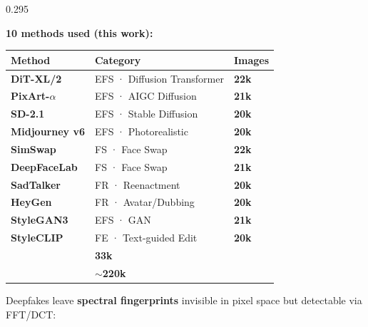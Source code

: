 \documentclass[final]{beamer}
\begin{document}
\begin{frame}[t]{}
\begin{columns}[T]
\begin{column}{0.295\linewidth}
\begin{tcolorbox}[card, title={\faDatabase\ \ DF40 Dataset — NeurIPS 2024},
  colbacktitle=Navy, coltitle=White]
\vspace{6pt}
\textbf{10 methods used (this work):}

\vspace{3pt}
\renewcommand{\arraystretch}{1.15}
{\footnotesize
\begin{tabularx}{\linewidth}{@{}>{\bfseries}l X >{\color{Teal}\bfseries\raggedleft\arraybackslash}p{1.2cm}@{}}
\toprule
\rowcolor{Navy!8} Method & Category & Images \\
\midrule
\rowcolor{RowA} DiT-XL/2       & EFS · Diffusion Transformer & 22k \\
                PixArt-$\alpha$ & EFS · AIGC Diffusion        & 21k \\
\rowcolor{RowA} SD-2.1          & EFS · Stable Diffusion      & 20k \\
                Midjourney v6   & EFS · Photorealistic        & 20k \\
\rowcolor{RowA} SimSwap         & FS  · Face Swap             & 22k \\
                DeepFaceLab     & FS  · Face Swap             & 21k \\
\rowcolor{RowA} SadTalker       & FR  · Reenactment           & 20k \\
                HeyGen          & FR  · Avatar/Dubbing        & 20k \\
\rowcolor{RowA} StyleGAN3       & EFS · GAN                   & 21k \\
                StyleCLIP       & FE  · Text-guided Edit      & 20k \\
\midrule
\rowcolor{Navy!8}\multicolumn{2}{l}{\textbf{Real (FF++ + CelebDF)}} & \textbf{33k} \\
\rowcolor{Navy!14}\multicolumn{2}{l}{\textbf{Grand Total}} & \textbf{$\sim$220k} \\
\bottomrule
\end{tabularx}}
\end{tcolorbox}

\vspace{8pt}

\begin{tcolorbox}[card, title={\faWaveSquare\ \ Why Frequency Domain?},
  colbacktitle=Teal, coltitle=White]
\RaggedRight\small
Deepfakes leave \textbf{spectral fingerprints} invisible in
pixel space but detectable via FFT/DCT:


\end{tcolorbox}
\end{column}
\end{columns}
\end{frame}
\end{document}
